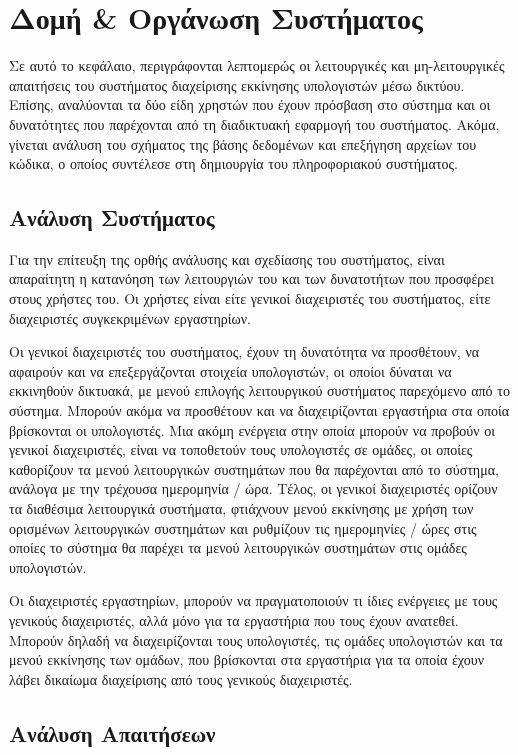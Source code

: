 \chapter{Δομή \& Οργάνωση Συστήματος}
Σε αυτό το κεφάλαιο, περιγράφονται λεπτομερώς οι λειτουργικές και μη-λειτουργικές απαιτήσεις του συστήματος διαχείρισης εκκίνησης υπολογιστών μέσω δικτύου. Επίσης, αναλύονται τα δύο είδη χρηστών που έχουν πρόσβαση στο σύστημα και οι δυνατότητες που παρέχονται από τη διαδικτυακή εφαρμογή του συστήματος. Ακόμα, γίνεται ανάλυση του σχήματος της βάσης δεδομένων και επεξήγηση αρχείων του κώδικα, ο οποίος συντέλεσε στη δημιουργία του πληροφοριακού συστήματος.

\section{Ανάλυση Συστήματος}
Για την επίτευξη της ορθής ανάλυσης και σχεδίασης του συστήματος, είναι απαραίτητη η κατανόηση των λειτουργιών του και των δυνατοτήτων που προσφέρει στους χρήστες του. Οι χρήστες είναι είτε γενικοί διαχειριστές του συστήματος, είτε διαχειριστές συγκεκριμένων εργαστηρίων.

Οι γενικοί διαχειριστές του συστήματος, έχουν τη δυνατότητα να προσθέτουν, να αφαιρούν και να επεξεργάζονται στοιχεία υπολογιστών, οι οποίοι δύναται να εκκινηθούν δικτυακά, με μενού επιλογής λειτουργικού συστήματος παρεχόμενο από το σύστημα. Μπορούν ακόμα να προσθέτουν και να διαχειρίζονται εργαστήρια στα οποία βρίσκονται οι υπολογιστές. Μια ακόμη ενέργεια στην οποία μπορούν να προβούν οι γενικοί διαχειριστές, είναι να τοποθετούν τους υπολογιστές σε ομάδες, οι οποίες καθορίζουν τα μενού λειτουργικών συστημάτων που θα παρέχονται από το σύστημα, ανάλογα με την τρέχουσα ημερομηνία / ώρα. Τέλος, οι γενικοί διαχειριστές ορίζουν τα διαθέσιμα λειτουργικά συστήματα, φτιάχνουν μενού εκκίνησης με χρήση των ορισμένων λειτουργικών συστημάτων και ρυθμίζουν τις ημερομηνίες / ώρες στις οποίες το σύστημα θα παρέχει τα μενού λειτουργικών συστημάτων στις ομάδες υπολογιστών.

Οι διαχειριστές εργαστηρίων, μπορούν να πραγματοποιούν τι ίδιες ενέργειες με τους γενικούς διαχειριστές, αλλά μόνο για τα εργαστήρια που τους έχουν ανατεθεί. Μπορούν δηλαδή να διαχειρίζονται τους υπολογιστές, τις ομάδες υπολογιστών και τα μενού εκκίνησης των ομάδων, που βρίσκονται στα εργαστήρια για τα οποία έχουν λάβει δικαίωμα διαχείρισης από τους γενικούς διαχειριστές.
 
\section{Ανάλυση Απαιτήσεων}

